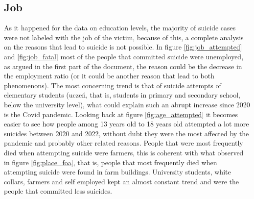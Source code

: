 \documentclass{article}
\begin{document}
\subsection{Job}
As it happened for the data on education levels,
the majority of suicide cases were not labeled with the 
job of the victim, because of this, a complete analysis on
the reasons that lead to suicide is not possible.
In figure \ref{fig:job_attempted} and \ref{fig:job_fatal}
most of the people that committed suicide were unemployed,
as argued in the first part of the document,
the reason could be the decrease in the employment ratio
(or it could be another reason that lead to both phenomenons).
The most concerning trend is that of suicide attempts of elementary students
(uczeń, that is, students in primary and secondary school, below the university level),
what could explain such an abrupt increase since 2020 is the Covid pandemic.
Looking back at figure \ref{fig:age_attempted} it becomes easier
to see how people among 13 years old to 18 years old attempted a lot 
more suicides between 2020 and 2022, without dubt they were
the most affected by the pandemic and probably other related reasons.
People that were most frequently died when attempting suicide
were farmers, this is coherent with what observed in figure \ref{fig:place_foa},
that is, people that most frequently died when attempting suicide were
found in farm buildings.
University students, white collars, farmers and self employed kept an almost constant
trend and were the people that committed less suicides.
\end{document}
